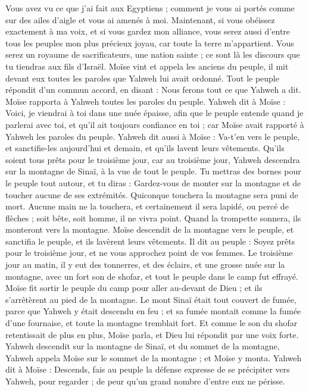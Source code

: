 \begin{multicols}{2}
Vous avez vu ce que j'ai fait aux Egyptiens ; comment je vous ai portés comme sur des ailes d'aigle et vous ai amenés à moi.
Maintenant, si vous obéissez exactement à ma voix, et si vous gardez mon alliance, vous serez aussi d'entre tous les peuples mon plus précieux joyau, car toute la terre m'appartient\FTNT{}.
Vous serez un royaume de sacrificateurs, une nation sainte ; ce sont là les discours que tu tiendras aux fils d'Israël.
Moïse vint et appela les anciens du peuple, il mit devant eux toutes les paroles que Yahweh lui avait ordonné.
Tout le peuple répondit d'un commun accord, en disant : Nous ferons tout ce que Yahweh a dit. Moïse rapporta à Yahweh toutes les paroles du peuple.
Yahweh dit à Moïse : Voici, je viendrai à toi dans une nuée épaisse, afin que le peuple entende quand je parlerai avec toi, et qu'il ait toujours confiance en toi ; car Moïse avait rapporté à Yahweh les paroles du peuple.
Yahweh dit aussi à Moïse : Va-t'en vers le peuple, et sanctifie-les aujourd'hui et demain, et qu'ils lavent leurs vêtements.
Qu'ils soient tous prêts pour le troisième jour, car au troisième jour, Yahweh descendra sur la montagne de Sinaï, à la vue de tout le peuple.
Tu mettras des bornes pour le peuple tout autour, et tu diras : Gardez-vous de monter sur la montagne et de toucher aucune de ses extrémités. Quiconque touchera la montagne sera puni de mort.
Aucune main ne la touchera, et certainement il sera lapidé, ou percé de flèches ; soit bête, soit homme, il ne vivra point. Quand la trompette sonnera, ils monteront vers la montagne.
Moïse descendit de la montagne vers le peuple, et sanctifia le peuple, et ils lavèrent leurs vêtements.
Il dit au peuple : Soyez prêts pour le troisième jour, et ne vous approchez point de vos femmes.
Le troisième jour au matin, il y eut des tonnerres, et des éclairs, et une grosse nuée sur la montagne, avec un fort son de shofar, et tout le peuple dans le camp fut effrayé.
Moïse fit sortir le peuple du camp pour aller au-devant de Dieu ; et ils s'arrêtèrent au pied de la montagne.
Le mont Sinaï était tout couvert de fumée, parce que Yahweh y était descendu en feu ; et sa fumée montait comme la fumée d'une fournaise, et toute la montagne tremblait fort.
Et comme le son du shofar retentissait de plus en plus, Moïse parla, et Dieu lui répondit par une voix forte.
Yahweh descendit sur la montagne de Sinaï, et du sommet de la montagne, Yahweh appela Moïse sur le sommet de la montagne ; et Moïse y monta.
Yahweh dit à Moïse : Descends, fais au peuple la défense expresse de se précipiter vers Yahweh, pour regarder ; de peur qu'un grand nombre d'entre eux ne périsse.

\end{multicols}
